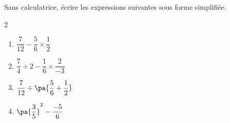\begin{exo}{}
	Sans calculatrice, écrire les expressions suivantes sous forme simplifiée.
	\vspace*{-2mm}\begin{multicols}{2}
	\begin{enumerate}[itemsep=2mm]
		\item $\dfrac{7}{12} - \dfrac{5}{6} \times \dfrac{1}{2}$
		\item $\dfrac{7}{4} \div 2 - \dfrac{1}{6} \times \dfrac{2}{-3}$
		\item $\dfrac{7}{12} \div \pa{\dfrac{5}{6} + \dfrac{1}{2}}$
		\item $\pa{\dfrac{3}{5}}^2 - \dfrac{-5}{6}$
	\end{enumerate}
	\end{multicols}\vspace*{-2mm}
\end{exo}
